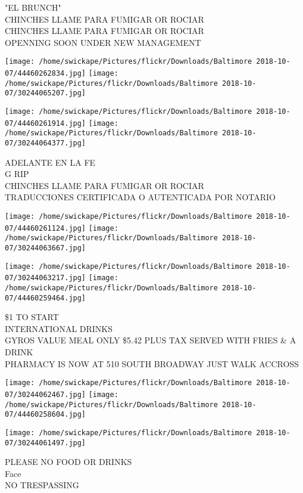 \documentclass[10pt,letterpaper]{article}
\begin{document}
"EL BRUNCH"\\
CHINCHES LLAME PARA FUMIGAR OR ROCIAR\\
CHINCHES LLAME PARA FUMIGAR OR ROCIAR\\
OPENNING SOON UNDER NEW MANAGEMENT\\
\pagebreak

\texttt{[image: /home/swickape/Pictures/flickr/Downloads/Baltimore 2018-10-07/44460262834.jpg]}
\texttt{[image: /home/swickape/Pictures/flickr/Downloads/Baltimore 2018-10-07/30244065207.jpg]}

\texttt{[image: /home/swickape/Pictures/flickr/Downloads/Baltimore 2018-10-07/44460261914.jpg]}
\texttt{[image: /home/swickape/Pictures/flickr/Downloads/Baltimore 2018-10-07/30244064377.jpg]}

ADELANTE EN LA FE\\
G RIP\\
CHINCHES LLAME PARA FUMIGAR OR ROCIAR\\
TRADUCCIONES CERTIFICADA O AUTENTICADA POR NOTARIO\\
\pagebreak

\texttt{[image: /home/swickape/Pictures/flickr/Downloads/Baltimore 2018-10-07/44460261124.jpg]}
\texttt{[image: /home/swickape/Pictures/flickr/Downloads/Baltimore 2018-10-07/30244063667.jpg]}

\texttt{[image: /home/swickape/Pictures/flickr/Downloads/Baltimore 2018-10-07/30244063217.jpg]}
\texttt{[image: /home/swickape/Pictures/flickr/Downloads/Baltimore 2018-10-07/44460259464.jpg]}

\$1 TO START\\
INTERNATIONAL DRINKS\\
GYROS VALUE MEAL ONLY \$5.42 PLUS TAX SERVED WITH FRIES \& A DRINK\\
PHARMACY IS NOW AT 510 SOUTH BROADWAY JUST WALK ACCROSS\\
\pagebreak

\texttt{[image: /home/swickape/Pictures/flickr/Downloads/Baltimore 2018-10-07/30244062467.jpg]}
\texttt{[image: /home/swickape/Pictures/flickr/Downloads/Baltimore 2018-10-07/44460258604.jpg]}

\vspace{0.25in}
\texttt{[image: /home/swickape/Pictures/flickr/Downloads/Baltimore 2018-10-07/30244061497.jpg]}

PLEASE NO FOOD OR DRINKS\\
Face\\
NO TRESPASSING\\
\pagebreak
\end{document}
